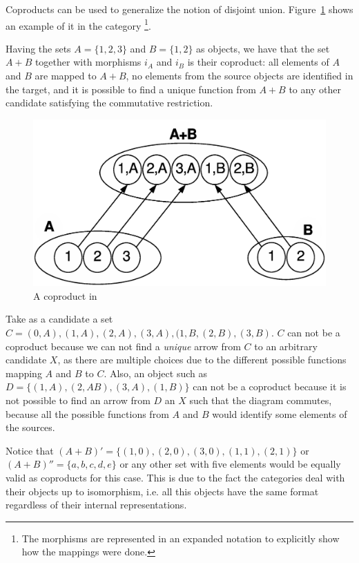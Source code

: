 \begin{example} Coproducts can be used to generalize the notion of disjoint union. Figure~\ref{fig:gts:coproduct} shows an example of it in the category \footnote{The morphisms are represented in an expanded notation to explicitly show how the mappings were done.}.

  Having the sets $A = \{1,2,3\}$ and $B = \{1,2\}$ as objects, we have that the set $A+B$ together with morphisms $i_A$ and $i_B$ is their coproduct: all elements of $A$ and $B$ are mapped to $A+B$, no elements from the source objects are identified in the target, and it is possible to find a unique function from $A+B$ to any other candidate satisfying the commutative restriction.

\begin{figure}[!ht]
  \centering
  \includegraphics[scale=0.4]{images/gts/coproduct-open}
  \caption{A coproduct in }\label{fig:gts:coproduct}
\end{figure}


  Take as a candidate a set $C = {(0,A),(1,A),(2,A),(3,A),(1,B},(2,B),(3,B)$. $C$ can not be a coproduct because we can not find a \emph{unique} arrow from $C$ to an arbitrary candidate $X$, as there are multiple choices due to the different possible functions mapping $A$ and $B$ to $C$. Also, an object such as $D = \{(1,A),(2,AB),(3,A),(1,B)\}$ can not be a coproduct because it is not possible to find an arrow from $D$ an $X$ such that the diagram commutes, because all the possible functions from $A$ and $B$ would identify some elements of the sources.

  Notice that $(A+B)' = \{(1,0),(2,0),(3,0),(1,1),(2,1)\}$ or $(A+B)'' = \{a,b,c,d,e\}$ or any other set with five elements would be equally valid as coproducts for this case. This is due to the fact the categories deal with their objects up to isomorphism, i.e. all this objects have the same format regardless of their internal representations.
\end{example}


